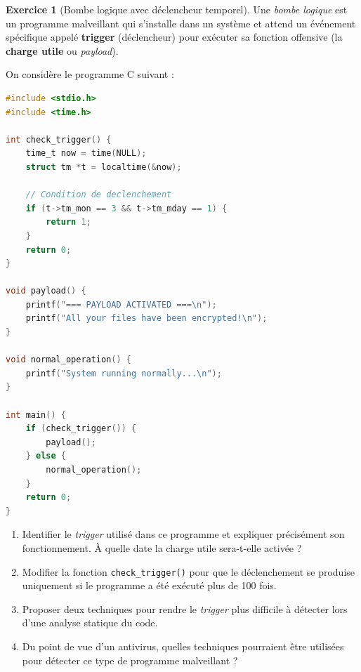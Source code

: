 \documentclass[a4paper,11pt]{article}
\theoremstyle{plain}
\theoremstyle{definition}
\newtheorem{exercice}{Exercice}
\begin{document}
\begin{exercice}[Bombe logique avec déclencheur temporel]

Une \textit{bombe logique} est un programme malveillant qui s'installe dans un système et attend un événement spécifique appelé \textbf{trigger} (déclencheur) pour exécuter sa fonction offensive (la \textbf{charge utile} ou \textit{payload}).

On considère le programme C suivant :

\begin{lstlisting}[language=C]
#include <stdio.h>
#include <time.h>

int check_trigger() {
    time_t now = time(NULL);
    struct tm *t = localtime(&now);

    // Condition de declenchement
    if (t->tm_mon == 3 && t->tm_mday == 1) {
        return 1;
    }
    return 0;
}

void payload() {
    printf("=== PAYLOAD ACTIVATED ===\n");
    printf("All your files have been encrypted!\n");
}

void normal_operation() {
    printf("System running normally...\n");
}

int main() {
    if (check_trigger()) {
        payload();
    } else {
        normal_operation();
    }
    return 0;
}
\end{lstlisting}

\begin{enumerate}
\item Identifier le \textit{trigger} utilisé dans ce programme et expliquer précisément son fonctionnement. À quelle date la charge utile sera-t-elle activée ?

\item Modifier la fonction \texttt{check\_trigger()} pour que le déclenchement se produise uniquement si le programme a été exécuté plus de 100 fois.

\item Proposer deux techniques pour rendre le \textit{trigger} plus difficile à détecter lors d'une analyse statique du code.

\item Du point de vue d'un antivirus, quelles techniques pourraient être utilisées pour détecter ce type de programme malveillant ?
\end{enumerate}

\end{exercice}
\end{document}
